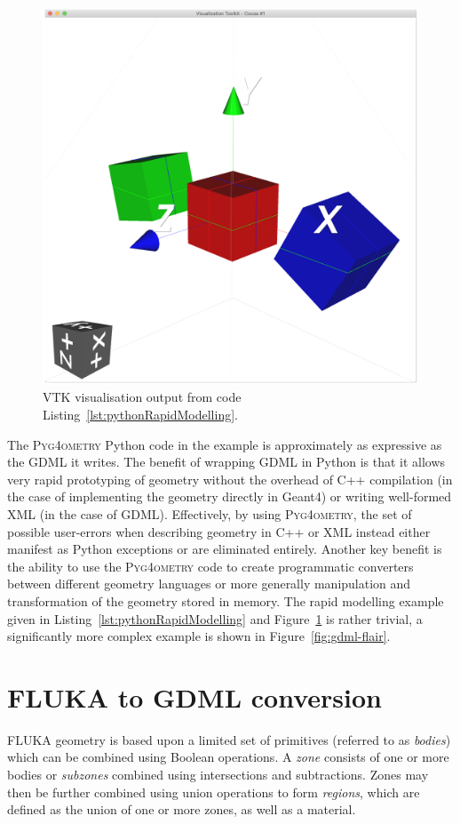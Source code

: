 \documentclass[preprint,12pt]{elsarticle}
\newcommand{\PYGEOMETRY}{\textsc{Pyg4ometry}}
\begin{document}
\begin{figure}[htbp]
\begin{center}
\includegraphics[width=0.9\columnwidth]{rapidModelling}
\caption{VTK visualisation output from code Listing~\ref{lst:pythonRapidModelling}.}
\label{fig:rapidModellingExample}
\end{center}
\end{figure}

The \PYGEOMETRY{} Python code in the example is approximately as expressive
as the GDML it writes. The benefit of wrapping GDML in Python is that it allows
 very rapid prototyping of geometry without the overhead of C++ compilation  (in the
case of implementing the geometry directly in Geant4) or writing well-formed XML (in the case of GDML). Effectively,
by using \PYGEOMETRY{}, the set of possible user-errors when describing geometry in C++ or XML
instead either manifest as Python exceptions or are eliminated entirely.
Another key benefit is the ability to use the \PYGEOMETRY{} code to create
programmatic converters between different geometry languages or more generally
manipulation and transformation of the geometry stored in memory. The rapid modelling
example given in Listing~\ref{lst:pythonRapidModelling} and Figure~\ref{fig:rapidModellingExample}
is rather trivial, a significantly more complex example is shown in Figure~\ref{fig:gdml-flair}.

\section{FLUKA to GDML conversion}
FLUKA geometry is based upon a limited set of primitives (referred to as
\emph{bodies}) which can be combined using Boolean operations. A
\emph{zone} consists of one or more bodies or \emph{subzones} combined
using intersections and subtractions.  Zones may then be further combined
using union operations to form \emph{regions}, which are defined as the
union of one or more zones, as well as a material.
\end{document}
